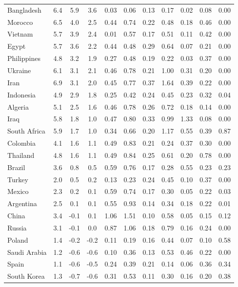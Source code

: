 \begin{tabular}[t]{lcccccccccc}
Bangladesh & 6.4 & 5.9 & 3.6 & 0.03 & 0.06 & 0.13 & 0.17 & 0.02 & 0.08 & 0.00\\
Morocco & 6.5 & 4.0 & 2.5 & 0.44 & 0.74 & 0.22 & 0.48 & 0.18 & 0.46 & 0.00\\
Vietnam & 5.7 & 3.9 & 2.4 & 0.01 & 0.57 & 0.17 & 0.51 & 0.11 & 0.42 & 0.00\\
Egypt & 5.7 & 3.6 & 2.2 & 0.44 & 0.48 & 0.29 & 0.64 & 0.07 & 0.21 & 0.00\\
Philippines & 4.8 & 3.2 & 1.9 & 0.27 & 0.48 & 0.19 & 0.22 & 0.03 & 0.37 & 0.00\\
Ukraine & 6.1 & 3.1 & 2.1 & 0.46 & 0.78 & 0.21 & 1.00 & 0.31 & 0.20 & 0.00\\
Iran & 6.9 & 3.1 & 2.0 & 0.45 & 0.77 & 0.37 & 1.64 & 0.39 & 0.22 & 0.00\\
Indonesia & 4.9 & 2.9 & 1.8 & 0.25 & 0.42 & 0.24 & 0.45 & 0.23 & 0.32 & 0.04\\
Algeria & 5.1 & 2.5 & 1.6 & 0.46 & 0.78 & 0.26 & 0.72 & 0.18 & 0.14 & 0.00\\
Iraq & 5.8 & 1.8 & 1.0 & 0.47 & 0.80 & 0.33 & 0.99 & 1.33 & 0.08 & 0.00\\
South Africa & 5.9 & 1.7 & 1.0 & 0.34 & 0.66 & 0.20 & 1.17 & 0.55 & 0.39 & 0.87\\
Colombia & 4.1 & 1.6 & 1.1 & 0.49 & 0.83 & 0.21 & 0.24 & 0.37 & 0.30 & 0.00\\
Thailand & 4.8 & 1.6 & 1.1 & 0.49 & 0.84 & 0.25 & 0.61 & 0.20 & 0.78 & 0.00\\
Brazil & 3.6 & 0.8 & 0.5 & 0.59 & 0.76 & 0.17 & 0.28 & 0.55 & 0.23 & 0.23\\
Turkey & 2.0 & 0.5 & 0.2 & 0.13 & 0.23 & 0.24 & 0.45 & 0.10 & 0.37 & 0.00\\
Mexico & 2.3 & 0.2 & 0.1 & 0.59 & 0.74 & 0.17 & 0.30 & 0.05 & 0.22 & 0.03\\
Argentina & 2.5 & 0.1 & 0.1 & 0.55 & 0.93 & 0.14 & 0.34 & 0.18 & 0.22 & 0.01\\
China & 3.4 & -0.1 & 0.1 & 1.06 & 1.51 & 0.10 & 0.58 & 0.05 & 0.15 & 0.12\\
Russia & 3.1 & -0.1 & 0.0 & 0.87 & 1.06 & 0.18 & 0.79 & 0.16 & 0.24 & 0.00\\
Poland & 1.4 & -0.2 & -0.2 & 0.11 & 0.19 & 0.16 & 0.44 & 0.07 & 0.10 & 0.58\\
Saudi Arabia & 1.2 & -0.6 & -0.6 & 0.10 & 0.36 & 0.13 & 0.53 & 0.46 & 0.22 & 0.00\\
Spain & 1.1 & -0.6 & -0.5 & 0.24 & 0.39 & 0.21 & 0.14 & 0.06 & 0.36 & 0.34\\
South Korea & 1.3 & -0.7 & -0.6 & 0.31 & 0.53 & 0.11 & 0.30 & 0.16 & 0.20 & 0.38\\

\end{tabular}
